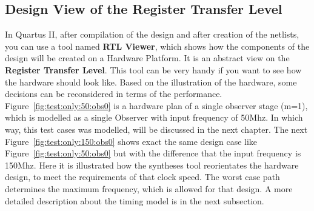 \subsection{Design View of the Register Transfer Level}
In Quartus II, after compilation of the design and after creation of the netlists, you can use a tool named \textbf{RTL Viewer}, which shows how
the components of the design will be created on a Hardware Platform. It is an abstract view on the \textbf{Register Transfer Level}. 
This tool can be very handy if you want to see how the hardware should look like. Based on the illustration of the hardware, some decisions can
be reconsidered in terms of the performance. \newline
Figure~\ref{fig:test:only:50:obs0} is a hardware plan of a single observer stage (m=1), which is modelled as a single Observer with input frequency of 50Mhz. 
In which way, this test cases was modelled, will be discussed in the next chapter. 
The next Figure~\ref{fig:test:only:150:obs0} shows exact the same design case like Figure~\ref{fig:test:only:50:obs0} but with the difference that the input frequency is 150Mhz. 
Here it is illustrated how the syntheses tool reorientates the hardware design, to meet the requirements of that clock speed. The worst case path determines the maximum frequency, 
which is allowed for that design. 
A more detailed description about the timing model is in the next subsection. 
